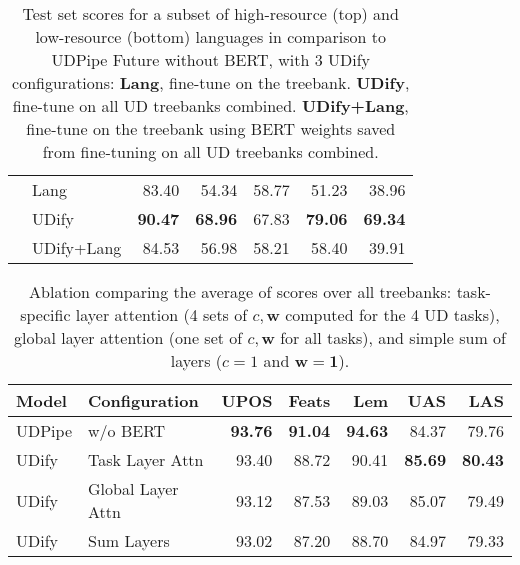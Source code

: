 \documentclass[11pt,a4paper]{article}
\renewcommand{\vec}[1]{\mathbold{#1}}
\begin{document}
\begin{table}[!t]
\begin{center}
\begin{tabularx}{\linewidth}{@{}Xlrrrrr@{}}
    \addlinespace[2pt]
        & Lang       &      83.40 &      54.34 &      58.77 &      51.23 &      38.96 \\
        & UDify      &  \bf 90.47 &  \bf 68.96 &      67.83 &  \bf 79.06 &  \bf 69.34 \\
        & UDify+Lang &      84.53 &      56.98 &      58.21 &      58.40 &      39.91 \\
    \bottomrule
    \end{tabularx}
    \end{center}
    \caption{\label{table:main-results} 
        Test set scores for a subset of high-resource (top) and low-resource (bottom) languages in comparison to UDPipe Future without BERT, with 3 UDify configurations:
        {\bf Lang}, fine-tune on the treebank.
        {\bf UDify}, fine-tune on all UD treebanks combined.
        {\bf UDify+Lang}, fine-tune on the treebank using BERT weights saved from fine-tuning on all UD treebanks combined.
    }
\end{table}

\begin{table}[!ht]
    \fontsize{8}{10}\selectfont
    \begin{center}
    \setlength{\tabcolsep}{3pt}
    \begin{tabularx}{\linewidth}{@{}lXrrrrr@{}}
    \toprule
        \sc Model & \sc Configuration & \sc UPOS & \sc Feats & \sc Lem & \sc UAS & \sc LAS \\
    \midrule
    UDPipe & w/o BERT          & \bf 93.76 & \bf 91.04 & \bf 94.63 &     84.37 &     79.76 \\
    \addlinespace
    UDify  & Task Layer Attn   &     93.40 &     88.72 &     90.41 & \bf 85.69 & \bf 80.43 \\
    UDify  & Global Layer Attn &     93.12 &     87.53 &     89.03 &     85.07 &     79.49 \\
    UDify  & Sum Layers        &     93.02 &     87.20 &     88.70 &     84.97 &     79.33 \\
    \bottomrule
    \end{tabularx}
    \end{center}
    \caption{\label{table:results-ablation}
        Ablation comparing the average of scores over all treebanks: task-specific layer attention (4 sets of $c,\vec{w}$ computed for the 4 UD tasks), global layer attention (one set of $c,\vec{w}$ for all tasks), and simple sum of layers ($c = 1$ and $\vec{w} = \vec{1}$).
    }
\end{table}
\end{document}

